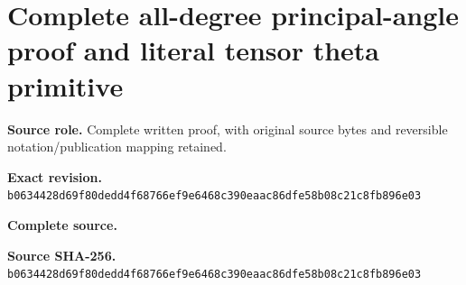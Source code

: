\begingroup
\sloppy
\small
\section{Complete all-degree principal-angle proof and literal tensor theta primitive}
\noindent\textbf{Source role.} Complete written proof, with original source bytes and reversible notation/publication mapping retained.\par
\noindent\textbf{Exact revision.} \nolinkurl{b0634428d69f80dedd4f68766ef9e6468c390eaac86dfe58b08c21c8fb896e03}\par
\noindent\textbf{Complete source.} \par
\noindent\textbf{Source SHA-256.} \nolinkurl{b0634428d69f80dedd4f68766ef9e6468c390eaac86dfe58b08c21c8fb896e03}\par\medskip

\endgroup
